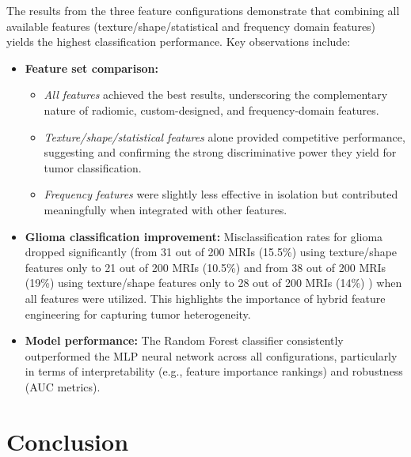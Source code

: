 \documentclass[11pt,a4paper]{report}
\begin{document}
The results from the three feature configurations demonstrate that combining all available 
features (texture/shape/statistical and frequency domain features) yields the highest 
classification performance. Key observations include:

\begin{itemize}
    \item \textbf{Feature set comparison:}

    \begin{itemize}
        \item \textit{All features} achieved the best results, underscoring the complementary nature of radiomic, custom-designed, 
		and frequency-domain features.
        \item \textit{Texture/shape/statistical features} alone provided competitive performance, 
		suggesting and confirming the strong discriminative power they yield for tumor classification.
        \item \textit{Frequency features} were slightly less effective in isolation 
		but contributed meaningfully when integrated with other features.
    \end{itemize}
    
    \item \textbf{Glioma classification improvement:}
	    Misclassification rates for glioma dropped significantly (from 31 out of 200 MRIs (15.5\%) using texture/shape features 
		only to 21 out of 200 MRIs (10.5\%)  and from 38 out of 200 MRIs (19\%) using texture/shape features 
		only to 28 out of 200 MRIs (14\%)  )
		when all features were utilized. This highlights the importance of hybrid feature engineering for capturing tumor heterogeneity.
    
    \item \textbf{Model performance:}
		The Random Forest classifier consistently outperformed the MLP neural network across all configurations, 
		particularly in terms of interpretability (e.g., feature importance rankings) and robustness (AUC metrics).
\end{itemize}
	

\chapter{Conclusion}







 
\end{document}
